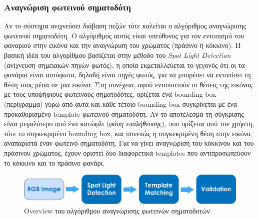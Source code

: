 \subsubsection{Αναγνώριση φωτεινού σηματοδότη}
Αν το σύστημα ανιχνεύσει διάβαση πεζών τότε καλείται ο αλγόριθμος αναγνώρισης φωτεινού σηματοδότη. Ο αλγόριθμος αυτός είναι υπεύθυνος για τον εντοπισμό του φαναριού στην εικόνα και την αναγνώριση του χρώματος (πράσινο ή κόκκινο). Η βασική ιδέα του αλγορίθμου βασίζεται στην μέθοδο του \emph{Spot Light Detection} (ανίχνευση σημειακών πηγών φωτός), η οποία εκμεταλλεύεται το γεγονός ότι οι τα φανάρια είναι αυτόφωτα, δηλαδή είναι πηγές φωτός, για να μπορέσει να εντοπίσει τη θέση τους μέσα σε μια εικόνα. Στη συνέχεια, αφού εντοπιστούν οι θέσεις της εικόνας με τους υποψήφιους φωτεινούς σηματοδότες, ορίζεται ένα bounding box (περίγραμμα) γύρω από αυτά και κάθε τέτοιο bounding box συγκρίνεται με ένα προκαθορισμένο template φωτεινού σηματοδότη. Αν το αποτέλεσμα τη σύγκρισης είναι μεγαλύτερο από ένα κατώφλι (\emph{φάση επαλήθευσης}), που ορίζεται από τον χρήστη, τότε το συγκεκριμένο bounding box, και συνεπώς η συγκεκριμένη θέση στην εικόνα, αναπαριστά έναν φωτεινό σηματοδότη. Για να γίνει αναγνώριση του κόκκινου και του πράσινου χρώματος, έχουν οριστεί δύο διαφορετικά templates που αντιπροσωπεύουν το κόκκινο και το πράσινο φανάρι.

\begin{figure}[H]
    \centering
    \includegraphics[width=\textwidth]{images/tl_system_overview.png}
    \caption{Overview του αλγόριθμου αναγνώρισης φωτεινών σηματοδοτών}
    \label{fig:tl-overview}
\end{figure}

